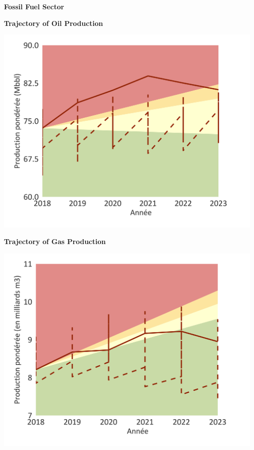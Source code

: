 \documentclass[10pt,table,a4]{article}\usepackage[]{graphicx}\usepackage[]{color}
\begin{document}
	\begin{center}
		\textbf{Fossil Fuel Sector}
	\end{center}
	
	\begin{minipage}[t]{.49\linewidth}
		\textbf{Trajectory of Oil Production }
		
		\includegraphics[trim = {0 0cm 0 0},width=1\linewidth]{ReportOutputs/Fig21}
		
	\end{minipage}	
	\hspace{.02\linewidth}
	\begin{minipage}[t]{.49\textwidth}
		\textbf{Trajectory of Gas Production }
		
		\includegraphics[trim = {0 0cm 0 0},width=1\linewidth]{ReportOutputs/Fig22}
		
	\end{minipage}
	
\end{document}
